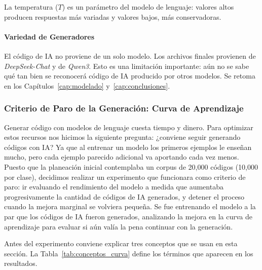 La temperatura ($T$) es un parámetro del modelo de lenguaje: valores altos producen respuestas más variadas y valores bajos, más conservadoras.

\paragraph{Variedad de Generadores}
El código de IA no proviene de un solo modelo. Los archivos finales provienen de \textit{DeepSeek-Chat} y de \textit{Qwen3}. Esto es una limitación importante: aún no se sabe qué tan bien se reconocerá código de IA producido por otros modelos. Se retoma en los Capítulos~\ref{cap:modelado} y~\ref{cap:conclusiones}.

\subsubsection{Criterio de Paro de la Generación: Curva de Aprendizaje}
\label{subsec:justificacion_tamano_sintetico}

Generar código con modelos de lenguaje cuesta tiempo y dinero. Para optimizar estos recursos nos hicimos la siguiente pregunta: ¿conviene seguir generando códigos con IA? Ya que al entrenar un modelo los primeros ejemplos le enseñan mucho, pero cada ejemplo parecido adicional va aportando cada vez menos. Puesto que la planeación inicial contemplaba un corpus de 20,000 códigos (10,000 por clase), decidimos realizar un experimento que funcionara como criterio de paro: ir evaluando el rendimiento del modelo a medida que aumentaba progresivamente la cantidad de códigos de IA generados, y detener el proceso cuando la mejora marginal se volviera pequeña. Se fue entrenando el modelo a la par que los códigos de IA fueron generados, analizando la mejora en la curva de aprendizaje para evaluar si aún valía la pena continuar con la generación.

Antes del experimento conviene explicar tres conceptos que se usan en esta sección. La Tabla~\ref{tab:conceptos_curva} define los términos que aparecen en los resultados.

